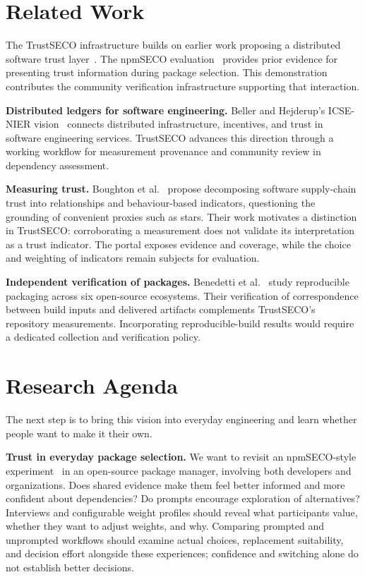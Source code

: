 \documentclass[10pt,conference]{IEEEtran}
\begin{document}
\section{Related Work}
The TrustSECO infrastructure builds on earlier work proposing a distributed software trust layer~\cite{hou2021trustseco}. The npmSECO evaluation~\cite{hou2024npmseco} provides prior evidence for presenting trust information during package selection. This demonstration contributes the community verification infrastructure supporting that interaction.

\textbf{Distributed ledgers for software engineering.} Beller and Hejderup's ICSE-NIER vision~\cite{beller2019blockchain} connects distributed infrastructure, incentives, and trust in software engineering services. TrustSECO advances this direction through a working workflow for measurement provenance and community review in dependency assessment.

\textbf{Measuring trust.} Boughton et al.~\cite{boughton2024decomposing} propose decomposing software supply-chain trust into relationships and behaviour-based indicators, questioning the grounding of convenient proxies such as stars. Their work motivates a distinction in TrustSECO: corroborating a measurement does not validate its interpretation as a trust indicator. The portal exposes evidence and coverage, while the choice and weighting of indicators remain subjects for evaluation.

\textbf{Independent verification of packages.} Benedetti et al.~\cite{benedetti2025reproducible} study reproducible packaging across six open-source ecosystems. Their verification of correspondence between build inputs and delivered artifacts complements TrustSECO's repository measurements. Incorporating reproducible-build results would require a dedicated collection and verification policy.

\section{Research Agenda}
The next step is to bring this vision into everyday engineering and learn whether people want to make it their own.

\textbf{Trust in everyday package selection.} We want to revisit an npmSECO-style experiment~\cite{hou2024npmseco} in an open-source package manager, involving both developers and organizations. Does shared evidence make them feel better informed and more confident about dependencies? Do prompts encourage exploration of alternatives? Interviews and configurable weight profiles should reveal what participants value, whether they want to adjust weights, and why. Comparing prompted and unprompted workflows should examine actual choices, replacement suitability, and decision effort alongside these experiences; confidence and switching alone do not establish better decisions.
\end{document}
